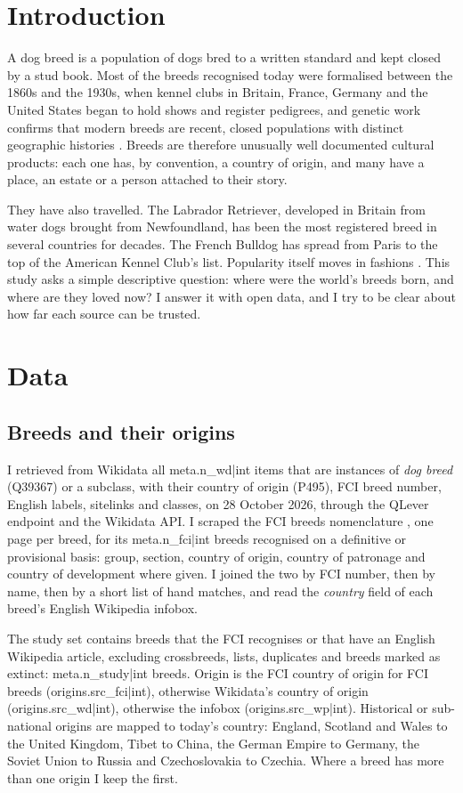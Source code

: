 \documentclass[11pt,a4paper]{article}
\begin{document}
\section{Introduction}
A dog breed is a population of dogs bred to a written standard and kept closed by a stud book. Most of the breeds recognised today were formalised between the 1860s and the 1930s, when kennel clubs in Britain, France, Germany and the United States began to hold shows and register pedigrees, and genetic work confirms that modern breeds are recent, closed populations with distinct geographic histories \citep{parker2004,parker2017}. Breeds are therefore unusually well documented cultural products: each one has, by convention, a country of origin, and many have a place, an estate or a person attached to their story.

They have also travelled. The Labrador Retriever, developed in Britain from water dogs brought from Newfoundland, has been the most registered breed in several countries for decades. The French Bulldog has spread from Paris to the top of the American Kennel Club's list. Popularity itself moves in fashions \citep{herzog2004,ghirlanda2013}. This study asks a simple descriptive question: where were the world's breeds born, and where are they loved now? I answer it with open data, and I try to be clear about how far each source can be trusted.

\section{Data}
\subsection{Breeds and their origins}
I retrieved from Wikidata \citep{wikidata} all {{meta.n_wd|int}} items that are instances of \emph{dog breed} (Q39367) or a subclass, with their country of origin (P495), FCI breed number, English labels, sitelinks and classes, on 28 October 2026, through the QLever endpoint and the Wikidata API. I scraped the FCI breeds nomenclature \citep{fci}, one page per breed, for its {{meta.n_fci|int}} breeds recognised on a definitive or provisional basis: group, section, country of origin, country of patronage and country of development where given. I joined the two by FCI number, then by name, then by a short list of hand matches, and read the \emph{country} field of each breed's English Wikipedia infobox.

The study set contains breeds that the FCI recognises or that have an English Wikipedia article, excluding crossbreeds, lists, duplicates and breeds marked as extinct: {{meta.n_study|int}} breeds. Origin is the FCI country of origin for FCI breeds ({{origins.src_fci|int}}), otherwise Wikidata's country of origin ({{origins.src_wd|int}}), otherwise the infobox ({{origins.src_wp|int}}). Historical or sub-national origins are mapped to today's country: England, Scotland and Wales to the United Kingdom, Tibet to China, the German Empire to Germany, the Soviet Union to Russia and Czechoslovakia to Czechia. Where a breed has more than one origin I keep the first.
\end{document}
